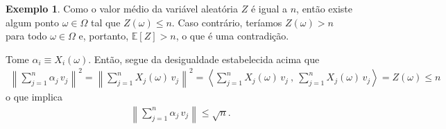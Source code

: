 \documentclass[12pt,portuguese]{article}
\theoremstyle{definition}
\newtheorem{example}[example]{Exemplo}
\begin{document}
\begin{example}
Como o valor médio da variável aleatória $Z$ é igual a $n$, então existe algum ponto
$\omega\in\Omega$ tal que $Z(\omega)\leqslant n$. Caso contrário, teríamos
$Z(\omega)>n$ para todo $\omega\in\Omega$ e, portanto, $\mathbb{E}[Z]>n$,
o que é uma contradição.

Tome $\alpha_i\equiv X_i(\omega)$. Então, segue da desigualdade estabelecida acima que
\begin{align*}
\left\| \sum_{j=1}^n \alpha_j\, v_j \right\|^2
=
\left\| \sum_{j=1}^n X_j(\omega)\, v_j \right\|^2
=
\left\langle \sum_{j=1}^n X_j(\omega)\, v_j\ , \ \sum_{j=1}^n X_j(\omega)\, v_j \right\rangle
=
Z(\omega)
\leqslant
n
\end{align*}
o que implica
\begin{align*}
\left\| \sum_{j=1}^n \alpha_j\, v_j \right\|  \leqslant \sqrt{n}.
\end{align*}
\end{example}



\end{document}
